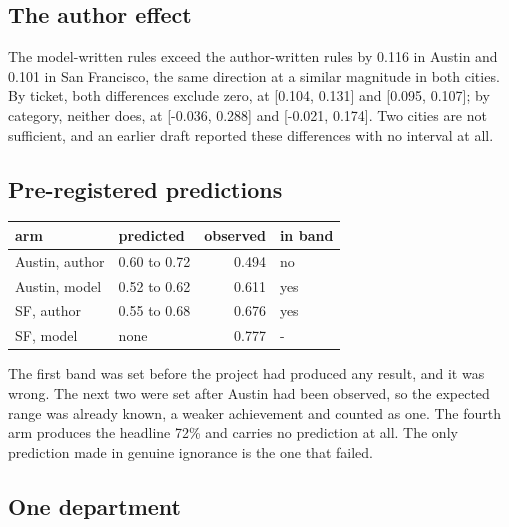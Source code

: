\documentclass[10pt,a4paper,twocolumn]{article}
\begin{document}
\subsection*{The author effect}

The model-written rules exceed the author-written rules by 0.116 in Austin and
0.101 in San Francisco, the same direction at a similar magnitude in both
cities. By ticket, both differences exclude zero, at [0.104, 0.131] and [0.095,
0.107]; by category, neither does, at [-0.036, 0.288] and [-0.021, 0.174]. Two
cities are not sufficient, and an earlier draft reported these differences with
no interval at all.

\subsection*{Pre-registered predictions}

\begin{center}
\footnotesize
\setlength{\tabcolsep}{4pt}
\begin{tabular}{llrl}
\toprule
arm & predicted & observed & in band \\
\midrule
Austin, author & 0.60 to 0.72 & 0.494 & no \\
Austin, model & 0.52 to 0.62 & 0.611 & yes \\
SF, author & 0.55 to 0.68 & 0.676 & yes \\
SF, model & none & 0.777 & - \\
\bottomrule
\end{tabular}
\end{center}

The first band was set before the project had produced any result, and it was
wrong. The next two were set after Austin had been observed, so the expected
range was already known, a weaker achievement and counted as one. The fourth arm
produces the headline 72\% and carries no prediction at all. The only prediction
made in genuine ignorance is the one that failed.

\subsection*{One department}
\end{document}
